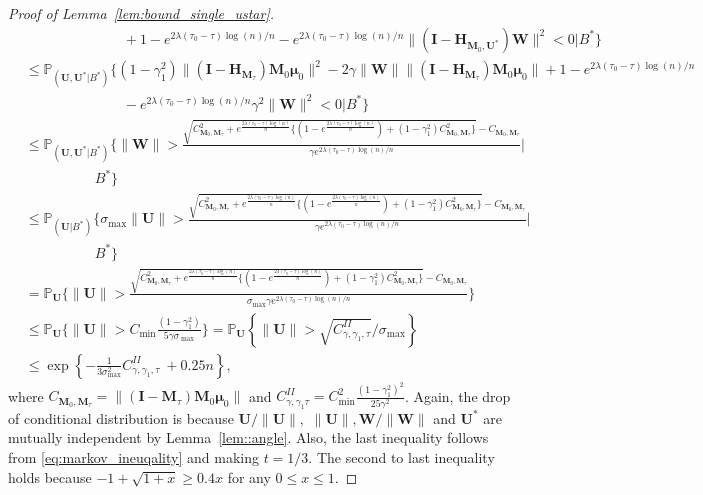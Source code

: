 \documentclass[12pt]{article}
\theoremstyle{shortspace}
\def\*#1{\bm{#1}}
\def\P{\mathbb P}
\begin{document}
\begin{proof}[Proof of Lemma~\ref{lem:bound_single_ustar}]
\begin{align*}
    & \quad  \qquad  \qquad \qquad   +1 -e^{2\lambda(\tau_0-\tau)\log(n)/n} - e^{2\lambda(\tau_0-\tau)\log(n)/n} \|(\*I-\*H_{\*M_0, \*U^*})\*W\|^2  < 0 \bigg|  B^*\bigg\}\\
           & \leq \P_{(\*U, \*U^*|B^*)}\bigg\{(1 - \gamma^2_1)\|(\*I-\*H_{\*M_\tau})\*M_0 \*\mu_0\|^2  - 2 \gamma\|\*W\| \|(\*I-\*H_{\*M_\tau})\*M_0 \*\mu_0\|  +1 -e^{2\lambda(\tau_0-\tau)\log(n)/n} \\
    & \quad  \qquad  \qquad \qquad   - e^{2\lambda(\tau_0-\tau)\log(n)/n} \gamma^2\|\*W\|^2  < 0 \bigg| B^*\bigg\}\\
     & \leq \P_{(\*U, \*U^*|B^*)}\bigg\{{\|\*W\| }  > 
     \frac{ \sqrt{ C^2_{\*M_0, \*M_\tau}  +e^{\frac{2\lambda(\tau_0-\tau)\log(n)}{n}} \{(1- e^{\frac{2\lambda(\tau_0-\tau)\log(n)}{n}} )+ (1- \gamma_1^2) C^2_{\*M_0, \*M_\tau}\}   } -C_{\*M_0, \*M_\tau} }{\gamma e^{2\lambda(\tau_0-\tau)\log(n)/n} }\bigg | \\
        & \quad  \qquad  \qquad B^* \bigg\}\\
      &  \leq \P_{(\*U|B^*)}\bigg\{{\sigma_{\max} \|\*U\| }  > 
     \frac{ \sqrt{ C^2_{\*M_0, \*M_\tau}  +e^{\frac{2\lambda(\tau_0-\tau)\log(n)}{n}} \{(1- e^{\frac{2\lambda(\tau_0-\tau)\log(n)}{n}} )+ (1- \gamma_1^2) C^2_{\*M_0, \*M_\tau}\}   } -C_{\*M_0, \*M_\tau} }{\gamma e^{2\lambda(\tau_0-\tau)\log(n)/n} }\bigg | \\
        & \quad  \qquad  \qquad B^* \bigg\}\\
        & =  \P_{\*U}\bigg\{{\|\*U\|}  >  \frac{ \sqrt{ C^2_{\*M_0, \*M_\tau}  +e^{\frac{2\lambda(\tau_0-\tau)\log(n)}{n}} \{(1- e^{\frac{2\lambda(\tau_0-\tau)\log(n)}{n}} )+ (1- \gamma_1^2) C^2_{\*M_0, \*M_\tau}\}   } -C_{\*M_0, \*M_\tau} }{\sigma_{\max}\gamma e^{2\lambda(\tau_0-\tau)\log(n)/n} } \bigg\}\\
     & \leq \P_{\*U}\bigg\{\|\*U\| > C_{\min} \frac{(1-\gamma_1^2)}{5\gamma\sigma_{\
     \max}}\bigg\} = \P_{\*U}\left\{\|\*U\|  >  \sqrt{C^{II}_{\gamma,\gamma_1,\tau}}/\sigma_{\max}\right\}\\
     & \leq \exp\left\{-\frac{1}{3\sigma^2_{\max}} C^{II}_{\gamma, \gamma_1, \tau}\ + 0.25n \right\}, 
\end{align*}
where $C_{\*M_0, \*M_\tau} = \|(\*I - \*M_\tau)\*M_0\*\mu_0\|$  and $ C^{II}_{\gamma, \gamma_1 \tau} =  C^2_{\min} \frac{(1-\gamma_1^2)^2}{25\gamma^2}$. Again, the 
 drop of conditional distribution is because $\*U/\|\*U\|,$ $\|\*U\|, \*W/\|\*W\|$ and $\*U^*$ are mutually independent by Lemma~\ref{lem::angle}. 
  Also, the last inequality follows from \eqref{eq:markov_ineuqality} and making $t = 1/3.$ The second to last inequality holds because $-1+\sqrt{1+x} \geq 0.4x$ for any $0 \leq x \leq 1.$ 



\end{proof}
\end{document}

